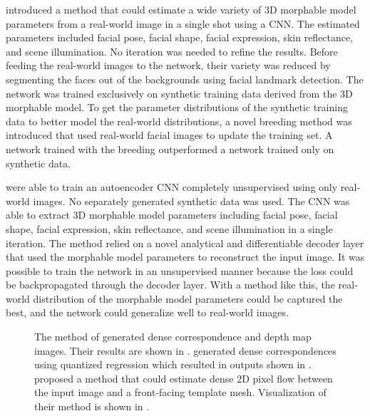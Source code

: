 \textcite{Kim2017} introduced a method that could estimate a wide variety of 3D morphable model parameters from a real-world image in a single shot using a \ac{CNN}. The estimated parameters included facial pose, facial shape, facial expression, skin reflectance, and scene illumination. No iteration was needed to refine the results. Before feeding the real-world images to the network, their variety was reduced by segmenting the faces out of the backgrounds using facial landmark detection. The network was trained exclusively on synthetic training data derived from the 3D morphable model. To get the parameter distributions of the synthetic training data to better model the real-world distributions, a novel breeding method was introduced that used real-world facial images to update the training set. A network trained with the breeding outperformed a network trained only on synthetic data.

\textcite{Tewari2017} were able to train an autoencoder \ac{CNN} completely unsupervised using only real-world images. No separately generated synthetic data was used. The \ac{CNN} was able to extract 3D morphable model parameters including facial pose, facial shape, facial expression, skin reflectance, and scene illumination in a single iteration. The method relied on a novel analytical and differentiable decoder layer that used the morphable model parameters to reconstruct the input image. It was possible to train the network in an unsupervised manner because the loss could be backpropagated through the decoder layer. With a method like this, the real-world distribution of the morphable model parameters could be captured the best, and the network could generalize well to real-world images.

\begin{figure}
    \centering
    \qquad\qquad
    
    \subfloat[\cite{Yu2017}]{\label{fig:face_reconstruction_2c}\texttt{[image: yu1]}}
    \caption[Face reconstruction 2]{The method of \textcite{Sela2017} generated dense correspondence and depth map images. Their results are shown in \protect{}. \textcite{Guler2016} generated dense correspondences using quantized regression which resulted in outputs shown in \protect{}. \textcite{Yu2017} proposed a method that could estimate dense 2D pixel flow between the input image and a front-facing template mesh. Visualization of their method is shown in \protect{}.}
    \label{fig:face_reconstruction_2}
\end{figure}

